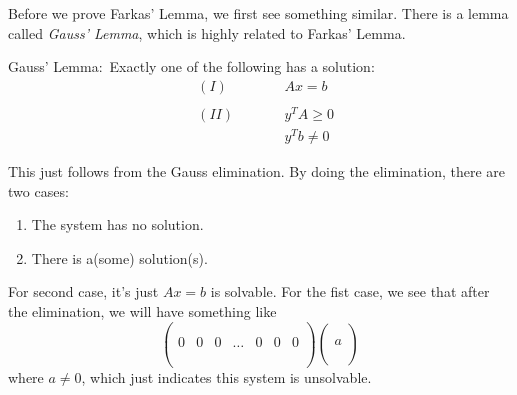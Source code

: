 Before we prove Farkas' Lemma, we first see something similar. There is a lemma called \emph{Gauss' Lemma}, which is highly related to Farkas' Lemma.
\begin{lemma}
	Gauss' Lemma\(\colon\) Exactly one of the following has a solution\(\colon\)
	\[
		\begin{alignedat}{3}
			& (I) \qquad&& Ax = b       \\\\
			& (II) \qquad&& y^{T}A\geq 0 \\
			&      && y^{T}b\neq  0
		\end{alignedat}
	\]
\end{lemma}

This just follows from the Gauss elimination. By doing the elimination, there are two cases\(\colon\)
\begin{enumerate}
	\item The system has no solution.
	\item There is a(some) solution(s).
\end{enumerate}

For second case, it's just \(Ax = b\) is solvable.  For the fist case, we see that after the elimination, we will have something like
\[
	\begin{pmatrix}
		  &   &   &        &   &   &   \\
		  &   &   &        &   &   &   \\
		0 & 0 & 0 & \ldots & 0 & 0 & 0 \\
		  &   &   &        &   &   &   \\
		  &   &   &        &   &   &   \\
	\end{pmatrix}
	\begin{pmatrix}
		\\
		\\
		a \\
		\\
		\\
	\end{pmatrix}
\]
where \(a\neq 0\), which just indicates this system is unsolvable.

